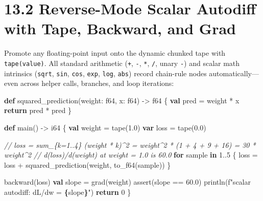 \documentclass[
  english,
  oneside]{book}
\newenvironment{Shaded}{\begin{snugshade}}{\end{snugshade}}
\newcommand{\CommentTok}[1]{\textcolor[rgb]{0.42,0.60,0.33}{\textit{#1}}}
\newcommand{\ControlFlowTok}[1]{\textcolor[rgb]{0.77,0.53,0.75}{\textbf{#1}}}
\newcommand{\DataTypeTok}[1]{\textcolor[rgb]{0.31,0.79,0.69}{#1}}
\newcommand{\DecValTok}[1]{\textcolor[rgb]{0.71,0.81,0.66}{#1}}
\newcommand{\FloatTok}[1]{\textcolor[rgb]{0.71,0.81,0.66}{#1}}
\newcommand{\FunctionTok}[1]{\textcolor[rgb]{0.86,0.86,0.67}{#1}}
\newcommand{\KeywordTok}[1]{\textcolor[rgb]{0.34,0.61,0.84}{\textbf{#1}}}
\newcommand{\NormalTok}[1]{\textcolor[rgb]{0.83,0.83,0.83}{#1}}
\newcommand{\OperatorTok}[1]{\textcolor[rgb]{0.83,0.83,0.83}{#1}}
\newcommand{\StringTok}[1]{\textcolor[rgb]{0.81,0.57,0.47}{#1}}
\begin{document}
\section{13.2 Reverse-Mode Scalar Autodiff with Tape, Backward, and
Grad}\label{reverse-mode-scalar-autodiff-with-tape-backward-and-grad}

Promote any floating-point input onto the dynamic chunked tape with
\texttt{tape(value)}. All standard arithmetic (\texttt{+}, \texttt{-},
\texttt{*}, \texttt{/}, unary \texttt{-}) and scalar math intrinsics
(\texttt{sqrt}, \texttt{sin}, \texttt{cos}, \texttt{exp}, \texttt{log},
\texttt{abs}) record chain-rule nodes automatically---even across helper
calls, branches, and loop iterations:

\begin{Shaded}
\begin{Highlighting}[]
\KeywordTok{def}\NormalTok{ squared\_prediction(weight: }\DataTypeTok{f64}\NormalTok{, x: }\DataTypeTok{f64}\NormalTok{) }\OperatorTok{{-}\textgreater{}} \DataTypeTok{f64}\NormalTok{ \{}
    \KeywordTok{val}\NormalTok{ pred }\OperatorTok{=}\NormalTok{ weight }\OperatorTok{*}\NormalTok{ x}
    \ControlFlowTok{return}\NormalTok{ pred }\OperatorTok{*}\NormalTok{ pred}
\NormalTok{\}}

\KeywordTok{def}\NormalTok{ main() }\OperatorTok{{-}\textgreater{}} \DataTypeTok{i64}\NormalTok{ \{}
    \KeywordTok{val}\NormalTok{ weight }\OperatorTok{=}\NormalTok{ tape(}\FloatTok{1.0}\NormalTok{)}
    \KeywordTok{var}\NormalTok{ loss }\OperatorTok{=}\NormalTok{ tape(}\FloatTok{0.0}\NormalTok{)}

    \CommentTok{// loss = sum\_\{k=1..4\} (weight * k)\^{}2 = weight\^{}2 * (1 + 4 + 9 + 16) = 30 * weight\^{}2}
    \CommentTok{// d(loss)/d(weight) at weight = 1.0 is 60.0}
    \ControlFlowTok{for}\NormalTok{ sample }\ControlFlowTok{in} \DecValTok{1}\OperatorTok{..}\DecValTok{5}\NormalTok{ \{}
\NormalTok{        loss }\OperatorTok{=}\NormalTok{ loss }\OperatorTok{+}\NormalTok{ squared\_prediction(weight, to\_f64(sample))}
\NormalTok{    \}}

\NormalTok{    backward(loss)}
    \KeywordTok{val}\NormalTok{ slope }\OperatorTok{=} \DataTypeTok{grad}\NormalTok{(weight)}
    \FunctionTok{assert}\NormalTok{(slope }\OperatorTok{==} \FloatTok{60.0}\NormalTok{)}
\NormalTok{    println(}\StringTok{f"scalar autodiff: dL/dw = }\ControlFlowTok{\{}\NormalTok{slope}\ControlFlowTok{\}}\StringTok{"}\NormalTok{)}
    \ControlFlowTok{return} \DecValTok{0}
\NormalTok{\}}
\end{Highlighting}
\end{Shaded}
\end{document}
